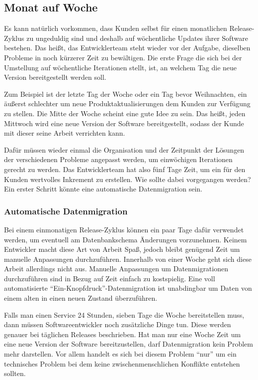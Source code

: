 \subsection{Monat auf Woche}
\label{subsec:monat-auf-woche}

Es kann natürlich vorkommen, dass Kunden selbst für einen monatlichen Release-Zyklus zu ungeduldig sind und deshalb auf wöchentliche Updates ihrer Software bestehen. Das heißt, das Entwicklerteam steht wieder vor der Aufgabe, dieselben Probleme in noch kürzerer Zeit zu bewältigen. Die erste Frage die sich bei der Umstellung auf wöchentliche Iterationen stellt, ist, an welchem Tag die neue Version bereitgestellt werden soll.

Zum Beispiel ist der letzte Tag der Woche oder ein Tag bevor Weihnachten, ein äußerst schlechter um neue Produktaktualisierungen dem Kunden zur Verfügung zu stellen. Die Mitte der Woche scheint eine gute Idee zu sein. Das heißt, jeden Mittwoch wird eine neue Version der Software bereitgestellt, sodass der Kunde mit dieser seine Arbeit verrichten kann. 

Dafür müssen wieder einmal die Organisation und der Zeitpunkt der Lösungen der verschiedenen Probleme angepasst werden, um einwöchigen Iterationen gerecht zu werden. Das Entwicklerteam hat also fünf Tage Zeit, um ein für den Kunden wertvolles Inkrement zu erstellen. Wie sollte dabei vorgegangen werden? Ein erster Schritt könnte eine automatische Datenmigration sein.

\subsubsection{Automatische Datenmigration}

Bei einem einmonatigen Release-Zyklus können ein paar Tage dafür verwendet werden, um eventuell am Datenbankschema Änderungen vorzunehmen. Keinem Entwickler macht diese Art von Arbeit Spaß, jedoch bleibt genügend Zeit um manuelle Anpassungen durchzuführen. Innerhalb von einer Woche geht sich diese Arbeit allerdings nicht aus. Manuelle Anpassungen um Datenmigrationen durchzuführen sind in Bezug auf Zeit einfach zu kostspielig. Eine voll automatisierte \enquote{Ein-Knopfdruck}-Datenmigration ist unabdingbar um Daten von einem alten in einen neuen Zustand überzuführen. 

Falls man einen Service 24 Stunden, sieben Tage die Woche bereitstellen muss, dann müssen Softwareentwickler noch zusätzliche Dinge tun. Diese werden genauer bei täglichen Releases beschrieben. Hat man nur eine Woche Zeit um eine neue Version der Software bereitzustellen, darf Datenmigration kein Problem mehr darstellen. Vor allem handelt es sich bei diesem Problem \enquote{nur} um ein  technisches Problem bei dem keine zwischenmenschlichen Konflikte entstehen sollten. 

